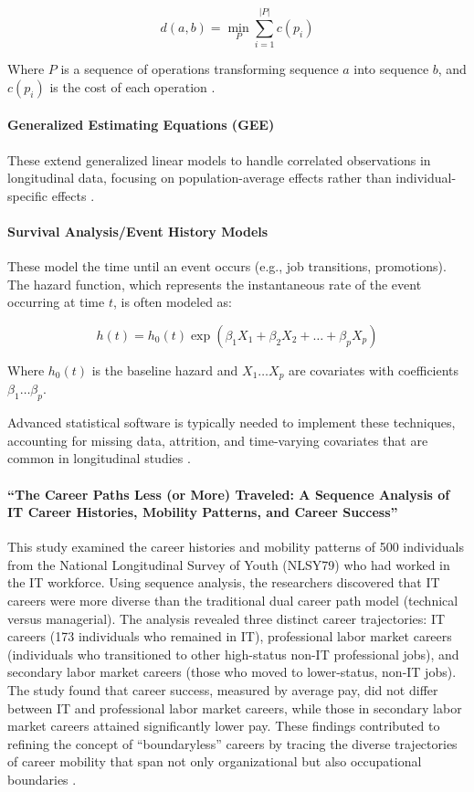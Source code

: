 \documentclass[../main.tex]{subfiles}
\begin{document}
\[ d(a,b) = \min_P \sum_{i=1}^{|P|} c(p_i) \]

Where \(P\) is a sequence of operations transforming sequence \(a\) into sequence \(b\), and \(c(p_i)\) is the cost of each operation \cite{joseph2012career}.

\paragraph{Generalized Estimating Equations (GEE)}
These extend generalized linear models to handle correlated observations in longitudinal data, focusing on population-average effects rather than individual-specific effects \cite{statsmodels2024}.

\paragraph{Survival Analysis/Event History Models}
These model the time until an event occurs (e.g., job transitions, promotions). The hazard function, which represents the instantaneous rate of the event occurring at time \(t\), is often modeled as:

\[ h(t) = h_0(t) \exp(\beta_1 X_1 + \beta_2 X_2 + \ldots + \beta_p X_p) \]

Where \(h_0(t)\) is the baseline hazard and \(X_1 \ldots X_p\) are covariates with coefficients \(\beta_1 \ldots \beta_p\).

Advanced statistical software is typically needed to implement these techniques, accounting for missing data, attrition, and time-varying covariates that are common in longitudinal studies \cite{lme4slides2011, statsmodels2024}.


\paragraph{``The Career Paths Less (or More) Traveled: A Sequence Analysis of IT Career Histories, Mobility Patterns, and Career Success''}
This study examined the career histories and mobility patterns of 500 individuals from the National Longitudinal Survey of Youth (NLSY79) who had worked in the IT workforce. Using sequence analysis, the researchers discovered that IT careers were more diverse than the traditional dual career path model (technical versus managerial). The analysis revealed three distinct career trajectories: IT careers (173 individuals who remained in IT), professional labor market careers (individuals who transitioned to other high-status non-IT professional jobs), and secondary labor market careers (those who moved to lower-status, non-IT jobs). The study found that career success, measured by average pay, did not differ between IT and professional labor market careers, while those in secondary labor market careers attained significantly lower pay. These findings contributed to refining the concept of ``boundaryless'' careers by tracing the diverse trajectories of career mobility that span not only organizational but also occupational boundaries \cite{joseph2012career}.
\end{document}
